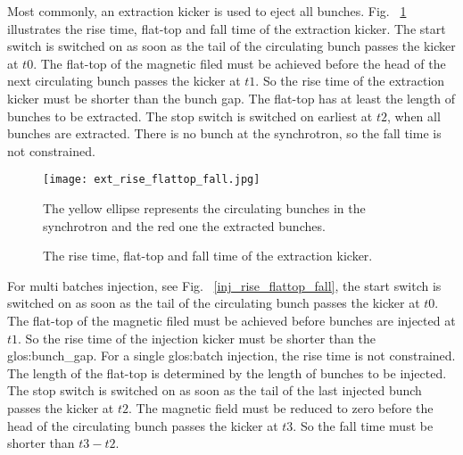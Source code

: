 %		  
%


Most commonly, an extraction kicker is used to eject all bunches. Fig. ~\ref{ext_rise_flattop_fall} illustrates the rise time, flat-top and fall time of the extraction kicker. The start switch is switched on as soon as the tail of the circulating bunch passes the kicker at $t0$. The flat-top of the magnetic filed must be achieved before the head of the next circulating bunch passes the kicker at $t1$. So the rise time of the extraction kicker must be shorter than the bunch gap. The flat-top has at least the length of bunches to be extracted. The stop switch is switched on earliest at $t2$, when all bunches are extracted. There is no bunch at the synchrotron, so the fall time is not constrained. 

\begin{figure}[!htb]
   \centering   
   \texttt{[image: ext\_rise\_flattop\_fall.jpg]}
   \caption{The rise time, flat-top and fall time of the extraction kicker.}{The yellow ellipse represents the circulating bunches in the synchrotron and the red one the extracted bunches.}
   \label{ext_rise_flattop_fall}
\end{figure}
 
For multi batches injection, see Fig. ~\ref{inj_rise_flattop_fall}, the start switch is switched on as soon as the tail of the circulating bunch passes the kicker at $t0$. The flat-top of the magnetic filed must be achieved before bunches are injected at $t1$. So the rise time of the injection kicker must be shorter than the \gls{glos:bunch_gap}. For a single \gls{glos:batch} injection, the rise time is not constrained. The length of the flat-top is determined by the length of bunches to be injected. The stop switch is switched on as soon as the tail of the last injected bunch passes the kicker at $t2$. The magnetic field must be reduced to zero before the head of the circulating bunch passes the kicker at $t3$. So the fall time must be shorter than $t3-t2$.

